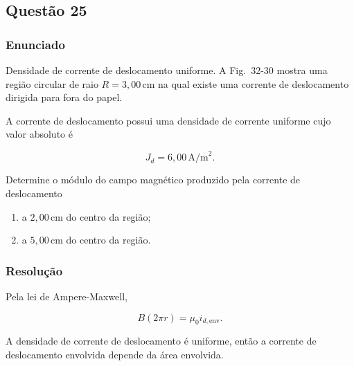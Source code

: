 \subsection{Questão 25}

\subsubsection{Enunciado}

Densidade de corrente de deslocamento uniforme. A Fig.~32-30 mostra uma região circular de raio 
\(R = 3{,}00\,\text{cm}\) na qual existe uma corrente de deslocamento dirigida para fora do papel.

A corrente de deslocamento possui uma densidade de corrente uniforme cujo valor absoluto é

\[
J_d = 6{,}00\,\text{A/m}^2.
\]

Determine o módulo do campo magnético produzido pela corrente de deslocamento

\begin{enumerate}
    \item[(a)] a \(2{,}00\,\text{cm}\) do centro da região;
    
    \item[(b)] a \(5{,}00\,\text{cm}\) do centro da região.
\end{enumerate}


\subsubsection{Resolução}

Pela lei de Ampere-Maxwell,

\[
B(2\pi r)=\mu_0 i_{d,\text{env}}.
\]

A densidade de corrente de deslocamento é uniforme, então a corrente de
deslocamento envolvida depende da área envolvida.

